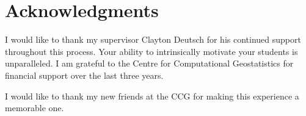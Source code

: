 
\chapter*{Acknowledgments}

I would like to thank my supervisor Clayton Deutsch for his continued support throughout this process. Your ability to intrinsically motivate your students is unparalleled. I am grateful to the Centre for Computational Geostatistics for financial support over the last three years.

I would like to thank my new friends at the CCG for making this experience a memorable one.